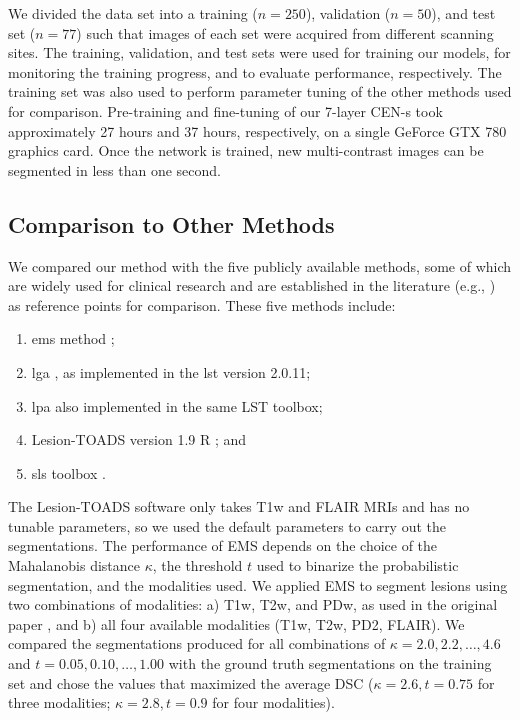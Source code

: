 We divided the data set into a training ($n=250$), validation ($n=50$), and test
set ($n=77$) such that images of each set were acquired from different scanning
sites. The training, validation, and test sets were used for training our
models, for monitoring the training progress, and to evaluate performance,
respectively. The training set was also used to perform parameter tuning of the
other methods used for comparison. Pre-training and fine-tuning of our 7-layer
CEN-s took approximately 27 hours and 37 hours, respectively, on a single
GeForce GTX 780 graphics card. Once the network is trained, new multi-contrast
images can be segmented in less than one second.

\subsection[Comparison to other methods]{Comparison to Other Methods}
\label{sec:othermethods}

We compared our method with the five publicly available methods, some of which
are widely used for clinical research and are established in the literature
(e.g., \citealp{sudre2015,subbanna2015,guizard2015}) as reference points for
comparison. These five methods include:
\begin{enumerate}
\item \Gls{ems} method \citep{vanleemput2001};
\item \Gls{lga} \citep{schmidt2012automated}, as
implemented in the \gls{lst} version 2.0.11;
\item \Gls{lpa} also implemented in the same LST toolbox;
\item Lesion-TOADS version 1.9 R \citep{shiee2010topology}; and 
\item \Gls{sls} toolbox \citep{roura2015}.
\end{enumerate}
The Lesion-TOADS software only takes T1w and FLAIR MRIs and has no tunable
parameters, so we used the default parameters to carry out the segmentations.
The performance of EMS depends on the choice of the Mahalanobis distance
$\kappa$, the threshold $t$ used to binarize the probabilistic segmentation, and
the modalities used. We applied EMS to segment lesions using two combinations of
modalities: a) T1w, T2w, and PDw, as used in the original paper
\citep{vanleemput2001}, and b) all four available modalities (T1w, T2w, PD2,
FLAIR). We compared the segmentations produced for all combinations of $\kappa =
2.0, 2.2, \dotsc, 4.6$ and $t = 0.05, 0.10, \dotsc, 1.00$ with the ground truth
segmentations on the training set and chose the values that maximized the
average DSC ($\kappa = 2.6, t = 0.75$ for three modalities; $\kappa = 2.8, t =
0.9$ for four modalities).

